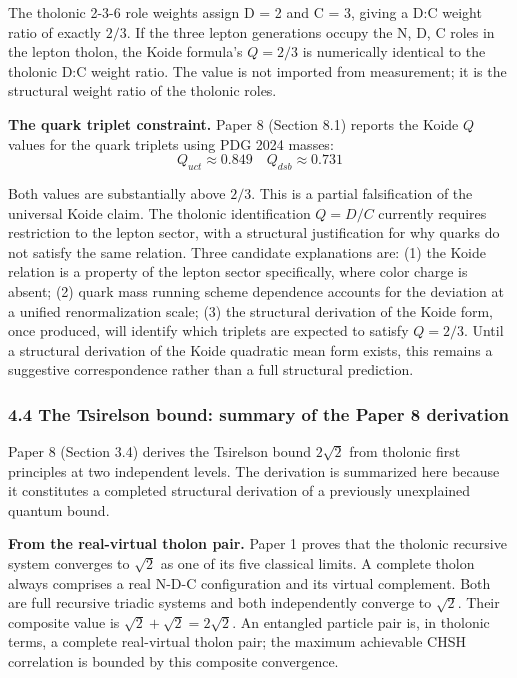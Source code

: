 \documentclass[
  11pt,
  letterpaper,
]{article}
\begin{document}
The tholonic 2-3-6 role weights assign D = 2 and C = 3, giving a D:C
weight ratio of exactly \(2/3\). If the three lepton generations occupy
the N, D, C roles in the lepton tholon, the Koide formula's \(Q = 2/3\)
is numerically identical to the tholonic D:C weight ratio. The value is
not imported from measurement; it is the structural weight ratio of the
tholonic roles.

\textbf{The quark triplet constraint.} Paper 8 (Section 8.1) reports the
Koide \(Q\) values for the quark triplets using PDG 2024 masses:
\[Q_{uct} \approx 0.849 \quad Q_{dsb} \approx 0.731\]

Both values are substantially above \(2/3\). This is a partial
falsification of the universal Koide claim. The tholonic identification
\(Q = D/C\) currently requires restriction to the lepton sector, with a
structural justification for why quarks do not satisfy the same
relation. Three candidate explanations are: (1) the Koide relation is a
property of the lepton sector specifically, where color charge is
absent; (2) quark mass running scheme dependence accounts for the
deviation at a unified renormalization scale; (3) the structural
derivation of the Koide form, once produced, will identify which
triplets are expected to satisfy \(Q = 2/3\). Until a structural
derivation of the Koide quadratic mean form exists, this remains a
suggestive correspondence rather than a full structural prediction.

\subsubsection{4.4 The Tsirelson bound: summary of the Paper 8
derivation}\label{the-tsirelson-bound-summary-of-the-paper-8-derivation}

Paper 8 (Section 3.4) derives the Tsirelson bound \(2\sqrt{2}\) from
tholonic first principles at two independent levels. The derivation is
summarized here because it constitutes a completed structural derivation
of a previously unexplained quantum bound.

\textbf{From the real-virtual tholon pair.} Paper 1 proves that the
tholonic recursive system converges to \(\sqrt{2}\) as one of its five
classical limits. A complete tholon always comprises a real N-D-C
configuration and its virtual complement. Both are full recursive
triadic systems and both independently converge to \(\sqrt{2}\). Their
composite value is \(\sqrt{2} + \sqrt{2} = 2\sqrt{2}\). An entangled
particle pair is, in tholonic terms, a complete real-virtual tholon
pair; the maximum achievable CHSH correlation is bounded by this
composite convergence.
\end{document}
